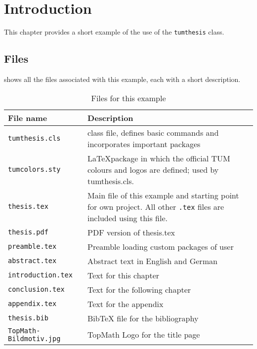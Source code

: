 \chapter{Introduction}
\label{ch:introduction}

This chapter provides a short example of the use of the \texttt{tumthesis} class.

\section{Files}
\label{sec:intro:files}

 shows all the files associated with this example, each with a short description.

\begin{table}[htb]
  \centering
  \begin{tabular}{lp{10cm}} 
    \toprule
    \textbf{File name} & \textbf{Description} \\ \midrule
    \texttt{tumthesis.cls} & class file, defines basic commands and incorporates important packages\\
    \texttt{tumcolors.sty} & \LaTeX package in which the official TUM colours and logos are defined; used by tumthesis.cls.\\
    \texttt{thesis.tex} & Main file of this example and starting point for own project. All other \texttt{.tex} files are included using this file.\\
    \texttt{thesis.pdf} & PDF version of thesis.tex\\
		\texttt{preamble.tex} & Preamble loading custom packages of user\\
    \texttt{abstract.tex} & Abstract text in English and German\\
    \texttt{introduction.tex} & Text for this chapter\\
    \texttt{conclusion.tex} & Text for the following chapter\\
    \texttt{appendix.tex} & Text for the appendix\\
    \texttt{thesis.bib} & Bib\TeX{} file for the bibliography\\
		\texttt{TopMath-Bildmotiv.jpg} & TopMath Logo for the title page\\
    \bottomrule
  \end{tabular} 
  \caption{Files for this example}
  \label{tab:intro:files}
\end{table}

